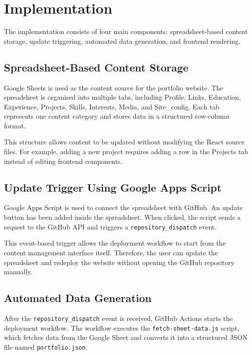 \documentclass[10pt,a4paper,twocolumn]{article}
\begin{document}
\section{Implementation}

The implementation consists of four main components: spreadsheet-based content storage, update triggering, automated data generation, and frontend rendering.

\subsection{Spreadsheet-Based Content Storage}

Google Sheets is used as the content source for the portfolio website. The spreadsheet is organised into multiple tabs, including Profile, Links, Education, Experience, Projects, Skills, Interests, Media, and Site\_config. Each tab represents one content category and stores data in a structured row-column format.

This structure allows content to be updated without modifying the React source files. For example, adding a new project requires adding a row in the Projects tab instead of editing frontend components.

\subsection{Update Trigger Using Google Apps Script}

Google Apps Script is used to connect the spreadsheet with GitHub. An update button has been added inside the spreadsheet. When clicked, the script sends a request to the GitHub API and triggers a \texttt{repository\_dispatch} event.

This event-based trigger allows the deployment workflow to start from the content management interface itself. Therefore, the user can update the spreadsheet and redeploy the website without opening the GitHub repository manually.

\subsection{Automated Data Generation}

After the \texttt{repository\_dispatch} event is received, GitHub Actions starts the deployment workflow. The workflow executes the \texttt{fetch-sheet-data.js} script, which fetches data from the Google Sheet and converts it into a structured JSON file named \texttt{portfolio.json}.
\end{document}
